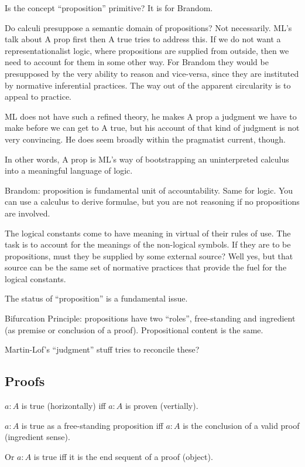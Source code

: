 \documentclass{article}
\begin{document}
Is the concept ``proposition'' primitive?  It is for Brandom.

Do calculi presuppose a semantic domain of propositions? Not
necessarily. ML's talk about A prop first then A true tries to address
this. If we do not want a representationalist logic, where
propositions are supplied from outside, then we need to account for
them in some other way. For Brandom they would be presupposed by the
very ability to reason and vice-versa, since they are instituted by
normative inferential practices. The way out of the apparent
circularity is to appeal to practice.

ML does not have such a refined theory, he makes A prop a judgment we
have to make before we can get to A true, but his account of that kind
of judgment is not very convincing. He does seem broadly within the
pragmatist current, though.

In other words, A prop is ML's way of bootstrapping an uninterpreted
calculus into a meaningful language of logic.

Brandom: proposition is fundamental unit of accountability. Same for
logic. You can use a calculus to derive formulae, but you are not
reasoning if no propositions are involved.

The logical constants come to have meaning in virtual of their rules
of use. The task is to account for the meanings of the non-logical
symbols. If they are to be propositions, must they be supplied by some
external source? Well yes, but that source can be the same set of
normative practices that provide the fuel for the logical constants.

The status of ``proposition'' is a fundamental issue.

Bifurcation Principle: propositions have two ``roles'', free-standing
and ingredient (as premise or conclusion of a proof). Propositional
content is the same.

Martin-Lof's ``judgment'' stuff tries to reconcile these?


\subsection{Proofs}


 \(a:A\) is true (horizontally) iff \(a:A\) is
proven (vertially).

 \(a:A\) is true as a free-standing proposition iff \(a:A\) is the
 conclusion of a valid proof (ingredient sense).

Or \(a:A\) is true iff it is the end sequent of a proof (object).
\end{document}
